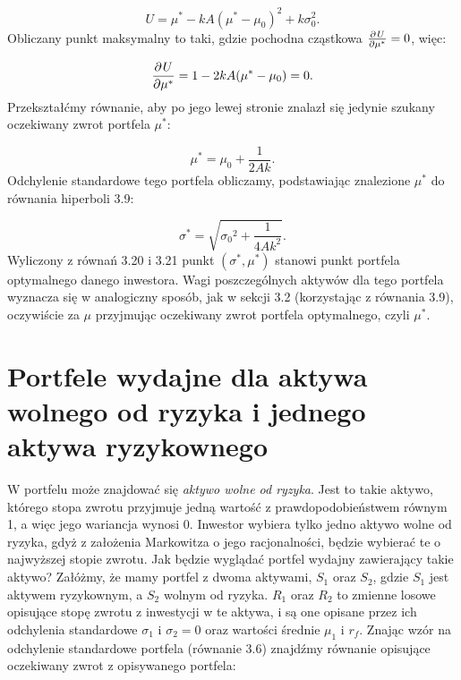 \documentclass[magister]{dyplom}
\begin{document}
\begin{equation}
	U = \mu^* - kA(\mu^* - \mu_0)^2 + k\sigma_0^2.
\end{equation}
Obliczany punkt maksymalny to taki, gdzie pochodna cząstkowa $\frac{\partial\\U}{\partial\mu^*} = 0$, więc:

\begin{equation}
	\frac{\partial\\U}{\partial\mu^*} = 1 - 2kA(\mu^* - \mu_0) = 0.
\end{equation}
Przekształćmy równanie, aby po jego lewej stronie znalazł się jedynie szukany oczekiwany zwrot portfela $\mu^*$:

\begin{equation}
	\mu^* = \mu_0 + \frac{1}{2Ak}.
\end{equation}
Odchylenie standardowe tego portfela obliczamy, podstawiając znalezione $\mu^*$ do równania hiperboli 3.9:

\begin{equation}
	\sigma^* = \sqrt{{\sigma_0}^2+\frac{1}{4Ak^2}}.
\end{equation}
Wyliczony z równań 3.20 i 3.21 punkt $(\sigma^*, \mu^* )$ stanowi punkt portfela optymalnego danego inwestora. Wagi poszczególnych aktywów dla tego portfela wyznacza się w analogiczny sposób, jak w sekcji 3.2 (korzystając z równania 3.9), oczywiście za $\mu$ przyjmując oczekiwany zwrot portfela optymalnego, czyli $\mu^*$.

\section{Portfele wydajne dla aktywa wolnego od ryzyka i jednego aktywa ryzykownego}
W portfelu może znajdować się \textit{aktywo wolne od ryzyka}. Jest to takie aktywo, którego stopa zwrotu przyjmuje jedną wartość z prawdopodobieństwem równym 1, a więc jego wariancja wynosi 0. Inwestor wybiera tylko jedno aktywo wolne od ryzyka, gdyż z założenia Markowitza o jego racjonalności, będzie wybierać te o najwyższej stopie zwrotu. Jak będzie wyglądać portfel wydajny zawierający takie aktywo? Załóżmy, że mamy portfel z dwoma aktywami, $S_1$ oraz $S_2$, gdzie $S_1$ jest aktywem ryzykownym, a $S_2$ wolnym od ryzyka. $R_1$ oraz $R_2$ to zmienne losowe opisujące stopę zwrotu z inwestycji w te aktywa, i są one opisane przez ich odchylenia standardowe $\sigma_1$ i $\sigma_2 = 0$ oraz wartości średnie $\mu_1$ i $r_f$. Znając wzór na odchylenie standardowe portfela (równanie 3.6) znajdźmy równanie opisujące oczekiwany zwrot z opisywanego portfela:
\end{document}
